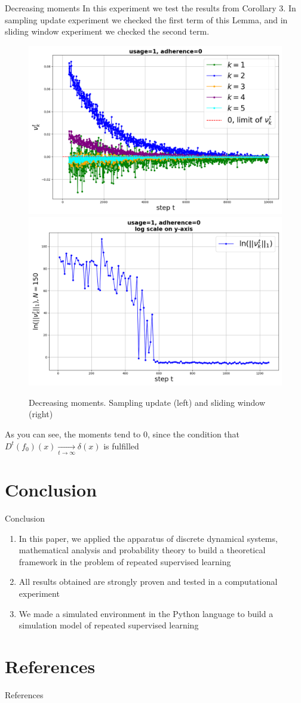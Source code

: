 \documentclass[aspectratio=169]{beamer}
\begin{document}
    \begin{frame}{Decreasing moments}
        \small
        In this experiment we test the results from Corollary 3. In sampling update experiment we checked the first term of this Lemma, and in sliding window experiment we checked the second term.

        \begin{figure}[h!]
            \centering
            \includegraphics[width=0.4\linewidth]{pictures/moments_sample_1_0.png}
            \includegraphics[width=0.4\linewidth]{pictures/moments_loop_1_0.png}
            
            \caption{Decreasing moments. Sampling update (left) and sliding window (right)}
            \label{fig_exp_5}
        \end{figure}

        As you can see, the moments tend to $0$, since the condition that $D^t(f_0)(x) \underset{t \to \infty}{\longrightarrow} \delta(x)$ is fulfilled
    \end{frame}

\section{Conclusion}

    \begin{frame}{Conclusion}
        \begin{enumerate}
            \item In this paper, we applied the apparatus of discrete dynamical systems, mathematical analysis and probability theory to build a theoretical framework in the problem of repeated supervised learning

            \item All results obtained are strongly proven and tested in a computational experiment

            \item We made a simulated environment in the Python language to build a simulation model of repeated supervised learning
        \end{enumerate}
    \end{frame}

\section{References}
    \begin{frame}{References}
        \tiny
        
          
    \end{frame} 
\end{document}
